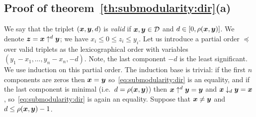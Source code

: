 \documentclass[11pt,onecolumn]{article}
\def\D{{\cal D}}
\newcommand{\bx}{\mbox{\boldmath $x$}}
\newcommand{\by}{\mbox{\boldmath $y$}}
\newcommand{\bz}{\mbox{\boldmath $z$}}
\begin{document}
\subsection{Proof of theorem~\ref{th:submodularity:dir}(a)}\label{ref:proof:parta}

We say that the triplet $(\bx,\by,d)$ is {\em valid} if $\bx,\by\in \D$ and $d\in [0,\rho(\bx,\by)]$.
We denote $\bz=\bx\uparrow^d \by$; we have $x_i\le 0\le z_i\le y_i$.
Let us introduce a partial order $\preceq$ over valid triplets as the lexicographical order with variables
$(y_1-x_1,\ldots,y_n-x_n,-d)$. Note, the last component $-d$ is the least significant.
We use induction on this partial order. 
The induction base is trivial: if the first $n$ components are zeros then $\bx=\by$ so~\eqref{eq:submodularity:dir} is an equality,
and if the last component is minimal (i.e.\ $d=\rho(\bx,\by)$) then $\bx\uparrow^d\by=\by$ and $\bx\downarrow_d\by=\bx$,
so~\eqref{eq:submodularity:dir} is again an equality. Suppose that $\bx\ne \by$ and $d\le \rho(\bx,\by)-1$. 
\end{document}
